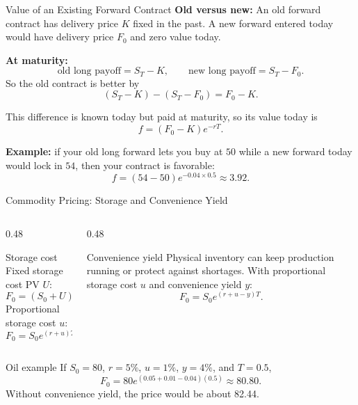 \documentclass[aspectratio=169,11pt]{beamer}
\begin{document}
\begin{frame}{Value of an Existing Forward Contract}
    \small
    \textbf{Old versus new:} An old forward contract has delivery price $K$ fixed in the past. A new forward entered today would have delivery price $F_0$ and zero value today.

    \medskip
    \textbf{At maturity:}
    \[
        \text{old long payoff}=S_T-K,\qquad
        \text{new long payoff}=S_T-F_0.
    \]
    So the old contract is better by
    \[
        (S_T-K)-(S_T-F_0)=F_0-K.
    \]

    \medskip
    This difference is known today but paid at maturity, so its value today is
    \[
        f=(F_0-K)e^{-rT}.
    \]

    \medskip
    \textbf{Example:} if your old long forward lets you buy at $50$ while a new forward today would lock in $54$, then your contract is favorable:
    \[
        f=(54-50)e^{-0.04\times 0.5}\approx 3.92.
    \]
\end{frame}

\begin{frame}{Commodity Pricing: Storage and Convenience Yield}
    \small
    \begin{columns}[T]
        \begin{column}{0.48\textwidth}
            \begin{block}{Storage cost}
                Fixed storage cost PV $U$:
                \[
                    F_0=(S_0+U)e^{rT}
                \]
                Proportional storage cost $u$:
                \[
                    F_0=S_0e^{(r+u)T}
                \]
            \end{block}
        \end{column}
        \begin{column}{0.48\textwidth}
            \begin{block}{Convenience yield}
                Physical inventory can keep production running or protect against shortages.
                With proportional storage cost $u$ and convenience yield $y$:
                \[
                    F_0=S_0e^{(r+u-y)T}.
                \]
            \end{block}
        \end{column}
    \end{columns}

    \begin{exampleblock}{Oil example}
        If $S_0=80$, $r=5\%$, $u=1\%$, $y=4\%$, and $T=0.5$,
        \[
            F_0=80e^{(0.05+0.01-0.04)(0.5)}\approx 80.80.
        \]
        Without convenience yield, the price would be about 82.44.
    \end{exampleblock}
\end{frame}
\end{document}
